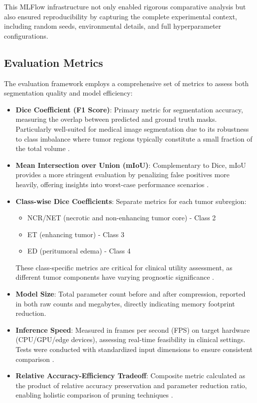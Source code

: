 \documentclass[12pt,a4paper]{article}
\begin{document}
This MLFlow infrastructure not only enabled rigorous comparative analysis but also ensured reproducibility by capturing the complete experimental context, including random seeds, environmental details, and full hyperparameter configurations.

\subsection{Evaluation Metrics}
The evaluation framework employs a comprehensive set of metrics to assess both segmentation quality and model efficiency:

\begin{itemize}
    \item \textbf{Dice Coefficient (F1 Score)}: Primary metric for segmentation accuracy, measuring the overlap between predicted and ground truth masks. Particularly well-suited for medical image segmentation due to its robustness to class imbalance where tumor regions typically constitute a small fraction of the total volume \cite{Sudre2017}.
    
    \item \textbf{Mean Intersection over Union (mIoU)}: Complementary to Dice, mIoU provides a more stringent evaluation by penalizing false positives more heavily, offering insights into worst-case performance scenarios \cite{Wang2023Review}.
    
    \item \textbf{Class-wise Dice Coefficients}: Separate metrics for each tumor subregion:
    \begin{itemize}
        \item NCR/NET (necrotic and non-enhancing tumor core) - Class 2
        \item ET (enhancing tumor) - Class 3 
        \item ED (peritumoral edema) - Class 4
    \end{itemize}
    These class-specific metrics are critical for clinical utility assessment, as different tumor components have varying prognostic significance \cite{Abidin2024}.
    
    \item \textbf{Model Size}: Total parameter count before and after compression, reported in both raw counts and megabytes, directly indicating memory footprint reduction.
    
    \item \textbf{Inference Speed}: Measured in frames per second (FPS) on target hardware (CPU/GPU/edge devices), assessing real-time feasibility in clinical settings. Tests were conducted with standardized input dimensions to ensure consistent comparison \cite{Chen2019}.
    
    \item \textbf{Relative Accuracy-Efficiency Tradeoff}: Composite metric calculated as the product of relative accuracy preservation and parameter reduction ratio, enabling holistic comparison of pruning techniques \cite{Li2023}.
\end{itemize}
\end{document}
